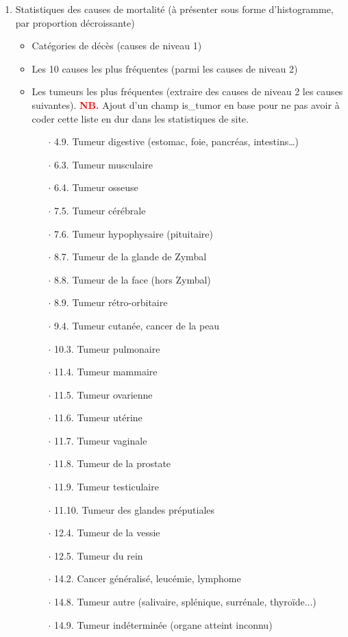 ﻿\documentclass[a4paper,10pt]{article}
\newcommand\desire[1]{\noindent\textbf{\textcolor{red}{#1}}}
\begin{document}
\begin{enumerate}
\item Statistiques des causes de mortalité (à présenter sous forme d'histogramme, par proportion décroissante)
\begin{itemize}
\item Catégories de décès (causes de niveau 1)
\item Les 10 causes les plus fréquentes (parmi les causes de niveau 2)
\item Les tumeurs les plus fréquentes (extraire des causes de niveau 2 les causes suivantes). \desire{NB.} Ajout d'un champ is\_tumor en base pour ne pas avoir à coder cette liste en dur dans les statistiques de site.
 \begin{itemize}
\item[$\cdot$ 4.9.]Tumeur digestive (estomac, foie, pancréas, intestins…)
\item[$\cdot$ 6.3.]Tumeur musculaire
\item[$\cdot$ 6.4.]Tumeur osseuse
\item[$\cdot$ 7.5.]Tumeur cérébrale
\item[$\cdot$ 7.6.]Tumeur hypophysaire (pituitaire)
\item[$\cdot$ 8.7.]Tumeur de la glande de Zymbal
\item[$\cdot$ 8.8.]Tumeur de la face (hors Zymbal)
\item[$\cdot$ 8.9.]Tumeur rétro-orbitaire
\item[$\cdot$ 9.4.]Tumeur cutanée, cancer de la peau
\item[$\cdot$ 10.3.]Tumeur pulmonaire
\item[$\cdot$ 11.4.]Tumeur mammaire
\item[$\cdot$ 11.5.]Tumeur ovarienne
\item[$\cdot$ 11.6.]Tumeur utérine
\item[$\cdot$ 11.7.]Tumeur vaginale
\item[$\cdot$ 11.8.]Tumeur de la prostate
\item[$\cdot$ 11.9.]Tumeur testiculaire
\item[$\cdot$ 11.10.]Tumeur des glandes préputiales
\item[$\cdot$ 12.4.]Tumeur de la vessie
\item[$\cdot$ 12.5.]Tumeur du rein
\item[$\cdot$ 14.2.]Cancer généralisé, leucémie, lymphome
\item[$\cdot$ 14.8.]Tumeur autre (salivaire, splénique, surrénale, thyroïde...) 
\item[$\cdot$ 14.9.]Tumeur indéterminée (organe atteint inconnu)
\end{itemize}
\end{itemize}
\end{enumerate}
\end{document}
